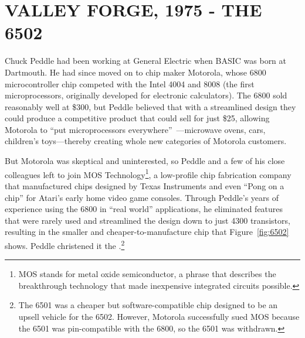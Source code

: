 
\section{VALLEY FORGE, 1975 - THE 6502}

Chuck Peddle had been working at General Electric when BASIC was
born at Dartmouth.  He had since moved on to chip maker Motorola, whose 6800
microcontroller chip competed with the Intel 4004 and
8008 (the first microprocessors, originally developed for
electronic calculators).  The 6800 sold reasonably well at \$300, but
Peddle  believed that with a streamlined design they could
produce a competitive product that could sell for just \$25,
allowing Motorola to ``put
microprocessors everywhere''~\cite[p. 31]{commodore}---microwave ovens,
cars, children's toys---thereby creating whole new categories of Motorola customers.

But Motorola was skeptical and uninterested, so Peddle and a few of his close
colleagues left to join MOS Technology\footnote{MOS stands
  for metal oxide 
semiconductor, a phrase that describes the breakthrough technology that
made inexpensive integrated circuits possible.}, a low-profile chip
fabrication company that manufactured chips designed by
Texas Instruments  and even ``Pong on a chip'' for Atari's early
home video game consoles.
Through Peddle's years
of experience using the 6800 in ``real world'' applications,
he eliminated features that were rarely used and streamlined the design
down to just 4300 transistors, resulting in the smaller and
cheaper-to-manufacture chip that Figure~\ref{fig:6502} shows.  Peddle
christened it the .\footnote{The 6501 was a 
  cheaper but software-compatible chip designed to be an upsell
  vehicle for the 6502. However, Motorola successfully sued MOS because
  the 6501 was 
  pin-compatible with the 6800, so the 6501 was withdrawn.}


